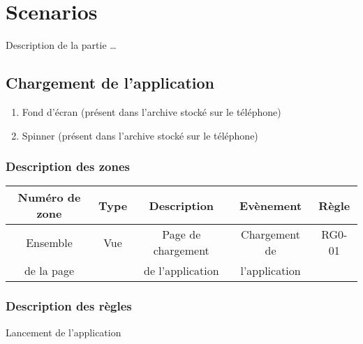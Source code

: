 \documentclass{report}
\begin{document}
	\section{Scenarios}
	
		Description de la partie \ldots

\newpage
	
	\subsection{Chargement de l'application}
	
		\hypertarget{Chargement de l'application}{}
		\label{Chargement de l'application}

		\begin{center}
			
		\end{center}
		
		\begin{enumerate}
		  \item Fond d'écran (présent dans l'archive stocké sur le téléphone)
		  \item Spinner (présent dans l'archive stocké sur le téléphone)
		\end{enumerate}
		
		\subsubsection{Description des zones}

			\begin{tabular}{|c|c|c|c|c|} \hline
				Numéro de zone & Type  & Description & Evènement &	Règle \\\hline 
				Ensemble   & Vue & Page de chargement & Chargement de & RG0-01\\
				de la page &     & de l'application   & l'application &       \\\hline
			\end{tabular}
		
		\subsubsection{Description des règles}
		Lancement de l’application 
		
\end{document}
